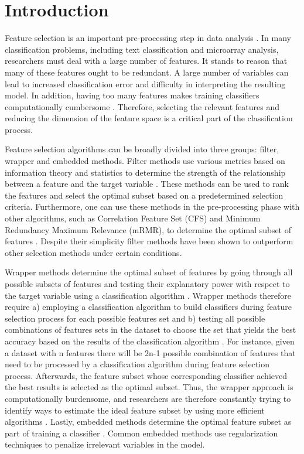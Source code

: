 \documentclass[review]{elsarticle}
\begin{document}
\linenumbers


\section{Introduction}


Feature selection is an important pre-processing step in data analysis \cite{Abdelhamid2017, Chandrashekar2014}. In many classification problems, including text classification and microarray analysis, researchers must deal with a large number of features. It stands to reason that many of these features ought to be redundant. A large number of variables can lead to increased classification error and difficulty in interpreting the resulting model. In addition, having too many features makes training classifiers computationally cumbersome \cite{Bunker2019}. Therefore, selecting the relevant features and reducing the dimension of the feature space is a critical part of the classification process. 

Feature selection algorithms can be broadly divided into three groups: filter, wrapper and embedded methods\cite{McCluskey2014}. Filter methods use various metrics based on information theory and statistics to determine the strength of the relationship between a feature and the target variable \cite{Kamalov2017}. These methods can be used to rank the features and select the optimal subset based on a predetermined selection criteria. Furthermore, one can use these methods in the pre-processing phase with other algorithms, such as Correlation Feature Set (CFS) and Minimum Redundancy Maximum Relevance (mRMR), to determine the optimal subset of features \cite{Hall1999, HanchuanPeng2005}. Despite their simplicity filter methods have been shown to outperform other selection methods under certain conditions. 


Wrapper methods determine the optimal subset of features by going through all possible subsets of features and testing their explanatory power with respect to the target variable using a classification algorithm \cite{Hall1999}. Wrapper methods therefore require a) employing a classification algorithm to build classifiers during feature selection process for each possible features set and b) testing all possible combinations of features sets in the dataset to choose the set that yields the best accuracy based on the results of the classification algorithm \cite{Li2017}. For instance, given a dataset with n features there will be 2n-1 possible combination of features that need to be processed by a classification algorithm during feature selection process. Afterwards, the feature subset whose corresponding classifier achieved the best results is selected as the optimal subset. Thus, the wrapper approach is computationally burdensome, and researchers are therefore constantly trying to identify ways to estimate the ideal feature subset by using more efficient algorithms \cite{Hoque2014,Zhou2016,Thabtah2016}. Lastly, embedded methods determine the optimal feature subset as part of training a classifier \cite{Al-Thubaity2013, Azhagusundari2013}. Common embedded methods use regularization techniques to penalize irrelevant variables in the model.
\end{document}
